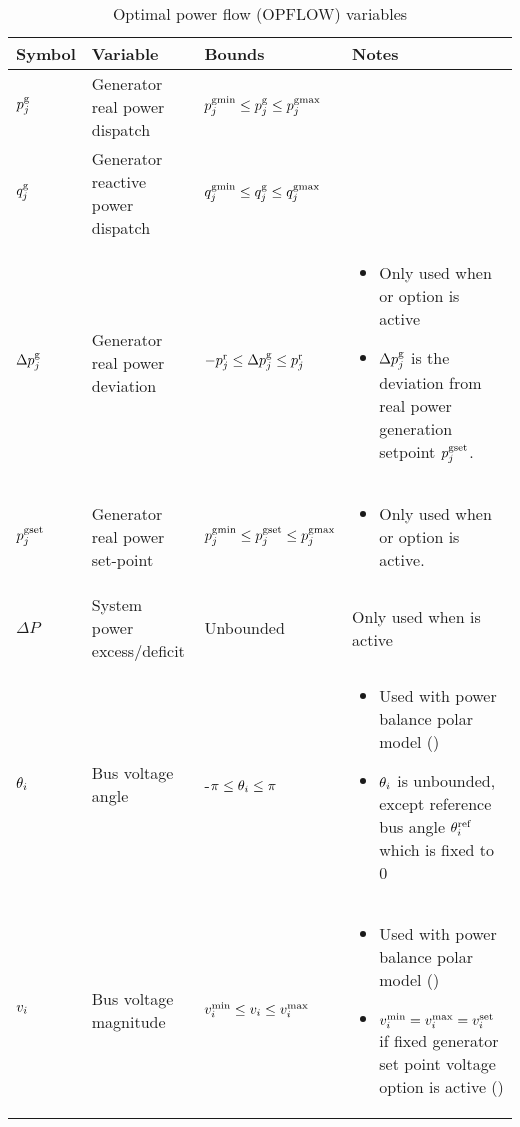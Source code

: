 \begin{table}[!htbp]
\caption{Optimal power flow (OPFLOW) variables}
\small
  \begin{tabular}{|p{}|p{}|p{}|p{}|}
   \hline
    \textbf{Symbol} & \textbf{Variable} & \textbf{Bounds} & \textbf{Notes} \\
    \hline
    $p^\text{g}_j$ & Generator real power dispatch & $p^\text{gmin}_j \le p^\text{g}_j \le p^\text{gmax}_j$ & ~\\
    \hline
    $q^\text{g}_j$ & Generator reactive power dispatch & $q^\text{gmin}_j \le q^\text{g}_j \le q^\text{gmax}_j$ & ~ \\
    \hline
    $\Delta{p}^\text{g}_j$ & Generator real power deviation & $-p^{\text{r}}_j \le \Delta{p}^\text{g}_j \le p^{\text{r}}_j$ & \begin{itemize}[noitemsep,topsep=0pt,leftmargin=*]  \item Only used when \option{\opflowgensetpoint} or \option{\opflowuseagc} option is active \item $\Delta{p}^\text{g}_j$ is the deviation from real power generation setpoint $p^{\text{gset}}_j$.\end{itemize} \\
    \hline
    $p^{\text{gset}}_j$ & Generator real power set-point & $p^\text{gmin}_j \le p^{\text{gset}}_j \le p^\text{gmax}_j$ & \begin{itemize}[noitemsep,topsep=0pt,leftmargin=*] \item Only used when \option{\opflowgensetpoint} or \option{\opflowuseagc} option is active. \end{itemize} \\
    \hline
    $\Delta{P}$ & System power excess/deficit & Unbounded & Only used when \option{\opflowuseagc} is active \\
    \hline
    $\theta_i$ & Bus voltage angle & -$\pi \le \theta_i \le \pi$ & 
    \begin{itemize}[noitemsep,topsep=0pt,leftmargin=*] 
    	\item Used with power balance polar model (\option{\opflowmodel~\pbpol}) 
	\item $\theta_i$ is unbounded, except reference bus angle $\theta^\text{ref}_i$ which is fixed to 0 
    \end{itemize} \\
    \hline
    $v_i$ & Bus voltage magnitude & $v^\text{min}_i \le v_i \le v^\text{max}_i$ & \begin{itemize}[noitemsep,topsep=0pt,leftmargin=*] \item Used with power balance polar model (\option{\opflowmodel~\pbpol})\item $v^\text{min}_i = v^\text{max}_i = v^\text{set}_i$ if fixed generator set point voltage option is active (\option{\opflowgensetpoint}) \end{itemize} \\

\end{tabular}
\end{table}
